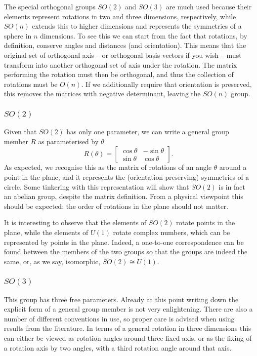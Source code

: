 \documentclass[notes.tex]{subfiles}
\begin{document}
The special orthogonal groups $SO(2)$ and $SO(3)$ are much used because their elements represent rotations in two and three dimensions, respectively, while $SO(n)$ extends this to higher dimensions and represents the symmetries of a sphere in $n$ dimensions. To see this we can start from the fact that rotations, by definition, conserve angles and distances (and orientation). This means that the original set of orthogonal axis -- or orthogonal basis vectors if you wish -- must transform into another orthogonal set of axis under the rotation. The matrix performing the rotation must then be orthogonal, and thus  the collection of rotations must be $O(n)$. If we additionally require that orientation is preserved, this removes the matrices with negative determinant, leaving the $SO(n)$ group.


\subsubsection{$SO(2)$}
Given that $SO(2)$ has only one parameter, we can write a general group member $R$ as parameterised by $\theta$
\begin{equation}
R(\theta)=\left[\begin{matrix} \cos\theta &  -\sin\theta \\ \sin\theta&  \cos\theta \end{matrix}\right].
\label{eq:SO2_parameterisation}
\end{equation}
As expected, we recognise this as the matrix of rotations of an angle $\theta$ around a point in the plane, and it represents the (orientation preserving) symmetries of a circle. Some tinkering with this representation will show that $SO(2)$ is in fact an abelian group, despite the matrix definition. From a physical viewpoint this should be expected: the order of rotations in the plane should not matter.

It is interesting to observe that the elements of $SO(2)$ rotate points in the plane, while the elements of $U(1)$ rotate complex numbers, which can be represented by points in the plane. Indeed, a one-to-one correspondence can be found between the members of the two groups so that the groups are indeed the same, or, as we say, isomorphic, $SO(2)\cong U(1)$.

\subsubsection{$SO(3)$}
This group has three free parameters. Already at this point writing down the explicit form of a general group member is not very enlightening. There are also a number of different conventions in use, so proper care is advised when using results from the literature. In terms of a general rotation in three dimensions this can either be viewed as rotation angles around three fixed axis, or as the fixing of a rotation axis by two angles, with a third rotation angle around that axis. 
\end{document}
